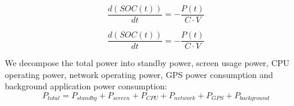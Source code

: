 \documentclass{mcmthesis}  %
\begin{document}
	\begin{titleoff}
		\begin{equation}
			\frac{d(SOC(t))}{dt} = -\frac{P(t)}{C \cdot V}
		\end{equation}
	\end{titleoff}
	
	\begin{titleon}[Theorem]
		\begin{equation}
			\frac{d(SOC(t))}{dt} = -\frac{P(t)}{C \cdot V}
		\end{equation}
	\end{titleon}
	
	We decompose the total power into standby power, screen usage power, CPU operating power, network operating power, GPS power consumption and background application power consumption:
	\begin{equation}
		P_{total}=P_{standby}+P_{screen}+P_{CPU}+P_{network}+P_{GPS}+P_{background}
	\end{equation}
	
\end{document}
